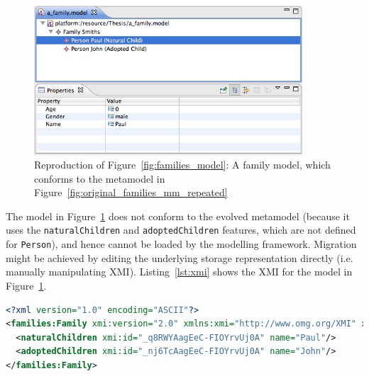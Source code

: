 \begin{figure}[htbp]
  \begin{center}
    \leavevmode
    \includegraphics[width=10cm]{5.Implementation/images/family_model.png}
  \end{center}
  \caption[A family model]{Reproduction of Figure~\ref{fig:families_model}: A family model, which conforms to the metamodel in Figure~\ref{fig:original_families_mm_repeated}}
  \label{fig:families_model_repeated}
\end{figure}

The model in Figure~\ref{fig:families_model_repeated} does not conform to the evolved metamodel (because it uses the \texttt{na\-tu\-ralCh\-il\-dr\-en} and \texttt{ad\-op\-t\-edCh\-il\-dr\-en} features, which are not defined for \texttt{Pe\-rs\-on}), and hence cannot be loaded by the modelling framework. Migration might be achieved by editing the underlying storage representation directly (i.e. manually manipulating XMI). Listing~\ref{lst:xmi} shows the XMI for the model in Figure~\ref{fig:families_model_repeated}.

\begin{lstlisting}[caption=XMI for the family model in Figure~\ref{fig:families_model_repeated}, label=lst:xmi, language=XML]
<?xml version="1.0" encoding="ASCII"?>
<families:Family xmi:version="2.0" xmlns:xmi="http://www.omg.org/XMI" xmlns:families="families" xmi:id="_kE2LkAagEeC-FIOYrvUj0A" name="Smiths">
  <naturalChildren xmi:id="_q8RWYAagEeC-FIOYrvUj0A" name="Paul"/>
  <adoptedChildren xmi:id="_nj6TcAagEeC-FIOYrvUj0A" name="John"/>
</families:Family>
\end{lstlisting}

